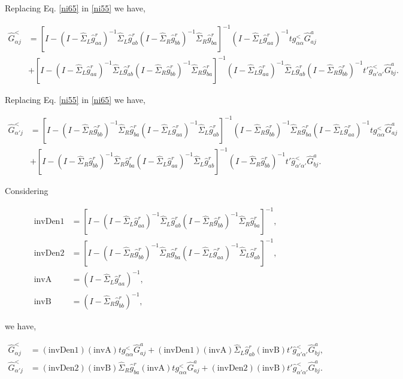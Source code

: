 \documentclass[10pt,prb,showpacs,amssymb,floatfix]{revtex4-1}
\newcommand{\tx}{\text}
\newcommand{\nn}{\nonumber}
\newcommand{\alp}{\alpha}
\newcommand{\Sg}{\Sigma}
\newcommand{\h}{\hat}
\begin{document}
Replacing Eq. \eqref{ni65} in \eqref{ni55} we have,

\begin{align}
\label{ni75}
\h G^<_{\alp j} &= [I - (I-\h \Sg_L \h g^r_{aa})^{-1} \h \Sg_L \h g^r_{ab}(I- \h \Sg_R  \h g^r_{b b})^{-1}\h \Sg_R  \h g^r_{b a}]^{-1}(I-\h \Sg_L \h g^r_{aa})^{-1} t g^<_{\alp\alp} \h{G}^a_{aj} \nn\\&+ [I - (I-\h \Sg_L \h g^r_{aa})^{-1} \h \Sg_L \h g^r_{ab}(I- \h \Sg_R  \h g^r_{b b})^{-1}\h \Sg_R  \h g^r_{b a}]^{-1}(I-\h \Sg_L \h g^r_{aa})^{-1} \h \Sg_L \h g^r_{ab} (I- \h \Sg_R  \h g^r_{b b})^{-1}t' \h g^<_{\alp'\alp'}\h{G}^a_{b j}.
\end{align}

Replacing Eq. \eqref{ni55} in \eqref{ni65} we have,

\begin{align}
\label{ni85}
\h G^<_{\alp' j} &= [I - (I- \h \Sg_R  \h g^r_{b b})^{-1}\h \Sg_R  \h g^r_{b a}(I-\h \Sg_L \h g^r_{aa})^{-1} \h \Sg_L \h g^r_{ab} ]^{-1}(I- \h \Sg_R  \h g^r_{b b})^{-1}\h \Sg_R  \h g^r_{b a}(I-\h \Sg_L \h g^r_{aa})^{-1} t g^<_{\alp\alp} \h{G}^a_{aj} \nn\\& + [I - (I- \h \Sg_R  \h g^r_{b b})^{-1}\h \Sg_R  \h g^r_{b a}(I-\h \Sg_L \h g^r_{aa})^{-1} \h \Sg_L \h g^r_{ab} ]^{-1}(I- \h \Sg_R  \h g^r_{b b})^{-1}t' \h g^<_{\alp'\alp'}\h{G}^a_{b j}.
\end{align}

Considering

\begin{align}
\label{def15}
\tx{invDen1}&= [I - (I-\h \Sg_L \h g^r_{aa})^{-1} \h \Sg_L \h g^r_{ab}(I- \h \Sg_R  \h g^r_{b b})^{-1}\h \Sg_R  \h g^r_{b a}]^{-1}, \\
\tx{invDen2}&= [I - (I- \h \Sg_R  \h g^r_{b b})^{-1}\h \Sg_R  \h g^r_{b a}(I-\h \Sg_L \h g^r_{aa})^{-1} \h \Sg_L \h g^r_{ab} ]^{-1}, \\
\tx{invA}&=(I-\h \Sg_L \h g^r_{aa})^{-1}, \\
\tx{invB}&=(I- \h \Sg_R  \h g^r_{b b})^{-1},
\label{def25}
\end{align}

we have,

\begin{align}
\label{ni105}
\h G^<_{\alp j} &= (\tx{invDen1})(\tx{invA}) t g^<_{\alp\alp} \h{G}^a_{aj}+ (\tx{invDen1})(\tx{invA}) \h \Sg_L \h g^r_{ab} (\tx{invB})t' \h g^<_{\alp'\alp'}\h{G}^a_{b j}, \\
\h G^<_{\alp' j} &= (\tx{invDen2})(\tx{invB})\h \Sg_R  \h g^r_{b a}(\tx{invA}) t g^<_{\alp\alp} \h{G}^a_{aj} + (\tx{invDen2})(\tx{invB})t' \h g^<_{\alp'\alp'}\h{G}^a_{b j}.
\label{ni115}
\end{align}
\end{document}
